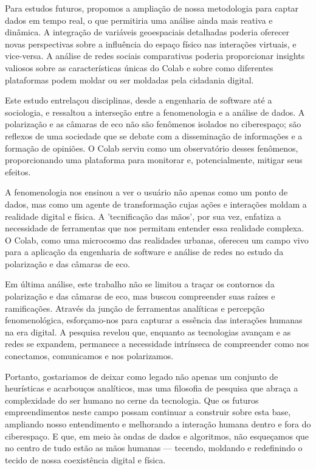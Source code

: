 Para estudos futuros, propomos a ampliação de nossa metodologia para captar dados em tempo real, o que permitiria uma análise ainda mais reativa e dinâmica. A integração de variáveis geoespaciais detalhadas poderia oferecer novas perspectivas sobre a influência do espaço físico nas interações virtuais, e vice-versa. A análise de redes sociais comparativas poderia proporcionar insights valiosos sobre as características únicas do Colab e sobre como diferentes plataformas podem moldar ou ser moldadas pela cidadania digital.

Este estudo entrelaçou disciplinas, desde a engenharia de software até a sociologia, e ressaltou a interseção entre a fenomenologia e a análise de dados. A polarização e as câmaras de eco não são fenômenos isolados no ciberespaço; são reflexos de uma sociedade que se debate com a disseminação de informações e a formação de opiniões. O Colab serviu como um observatório desses fenômenos, proporcionando uma plataforma para monitorar e, potencialmente, mitigar seus efeitos.

A fenomenologia nos ensinou a ver o usuário não apenas como um ponto de dados, mas como um agente de transformação cujas ações e interações moldam a realidade digital e física. A 'tecnificação das mãos', por sua vez, enfatiza a necessidade de ferramentas que nos permitam entender essa realidade complexa. O Colab, como uma microcosmo das realidades urbanas, ofereceu um campo vivo para a aplicação da engenharia de software e análise de redes no estudo da polarização e das câmaras de eco.

Em última análise, este trabalho não se limitou a traçar os contornos da polarização e das câmaras de eco, mas buscou compreender suas raízes e ramificações. Através da junção de ferramentas analíticas e percepção fenomenológica, esforçamo-nos para capturar a essência das interações humanas na era digital. A pesquisa revelou que, enquanto as tecnologias avançam e as redes se expandem, permanece a necessidade intrínseca de compreender como nos conectamos, comunicamos e nos polarizamos.

Portanto, gostariamos de deixar como legado não apenas um conjunto de heurísticas e acarbouços analíticos, mas uma filosofia de pesquisa que abraça a complexidade do ser humano no cerne da tecnologia. Que os futuros empreendimentos neste campo possam continuar a construir sobre esta base, ampliando nosso entendimento e melhorando a interação humana dentro e fora do ciberespaço. E que, em meio às ondas de dados e algoritmos, não esqueçamos que no centro de tudo estão as mãos humanas — tecendo, moldando e redefinindo o tecido de nossa coexistência digital e física.